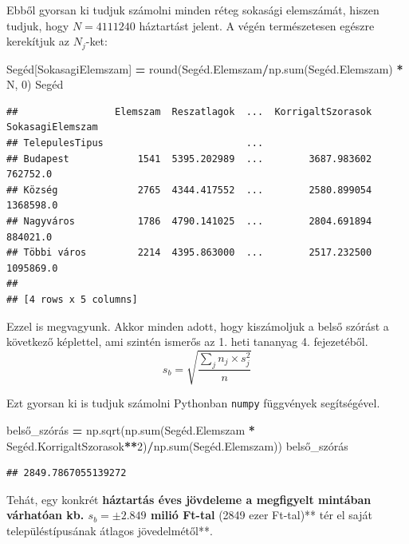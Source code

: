 \documentclass[
]{book}
\newenvironment{Shaded}{\begin{snugshade}}{\end{snugshade}}
\newcommand{\BuiltInTok}[1]{#1}
\newcommand{\DecValTok}[1]{\textcolor[rgb]{0.00,0.00,0.81}{#1}}
\newcommand{\NormalTok}[1]{#1}
\newcommand{\OperatorTok}[1]{\textcolor[rgb]{0.81,0.36,0.00}{\textbf{#1}}}
\newcommand{\StringTok}[1]{\textcolor[rgb]{0.31,0.60,0.02}{#1}}
\begin{document}
Ebből gyorsan ki tudjuk számolni minden réteg sokasági elemszámát, hiszen tudjuk, hogy \(N=4111240\) háztartást jelent. A végén természetesen egészre kerekítjuk az \(N_j\)-ket:

\begin{Shaded}
\begin{Highlighting}[]
\NormalTok{Segéd[}\StringTok{\textquotesingle{}SokasagiElemszam\textquotesingle{}}\NormalTok{] }\OperatorTok{=} \BuiltInTok{round}\NormalTok{(Segéd.Elemszam}\OperatorTok{/}\NormalTok{np.}\BuiltInTok{sum}\NormalTok{(Segéd.Elemszam) }\OperatorTok{*}\NormalTok{ N, }\DecValTok{0}\NormalTok{)}
\NormalTok{Segéd}
\end{Highlighting}
\end{Shaded}

\begin{verbatim}
##                 Elemszam  Reszatlagok  ...  KorrigaltSzorasok  SokasagiElemszam
## TelepulesTipus                         ...                                     
## Budapest            1541  5395.202989  ...        3687.983602          762752.0
## Község              2765  4344.417552  ...        2580.899054         1368598.0
## Nagyváros           1786  4790.141025  ...        2804.691894          884021.0
## Többi város         2214  4395.863000  ...        2517.232500         1095869.0
## 
## [4 rows x 5 columns]
\end{verbatim}

Ezzel is megvagyunk. Akkor minden adott, hogy kiszámoljuk a belső szórást a következő képlettel, ami szintén ismerős az 1. heti tananyag 4. fejezetéből. \[s_b=\sqrt{\frac{\sum_j{n_j \times s_j^2}}{n}}\]

Ezt gyorsan ki is tudjuk számolni Pythonban \texttt{numpy} függvények segítségével.

\begin{Shaded}
\begin{Highlighting}[]
\NormalTok{belső\_szórás }\OperatorTok{=}\NormalTok{ np.sqrt(np.}\BuiltInTok{sum}\NormalTok{(Segéd.Elemszam }\OperatorTok{*}\NormalTok{ Segéd.KorrigaltSzorasok}\OperatorTok{**}\DecValTok{2}\NormalTok{)}\OperatorTok{/}\NormalTok{np.}\BuiltInTok{sum}\NormalTok{(Segéd.Elemszam))}
\NormalTok{belső\_szórás}
\end{Highlighting}
\end{Shaded}

\begin{verbatim}
## 2849.7867055139272
\end{verbatim}

Tehát, egy konkrét \textbf{háztartás éves jövdeleme a megfigyelt mintában várhatóan kb. \(s_b=\pm 2.849\) milió Ft-tal }(2849 ezer Ft-tal)** tér el saját településtípusának átlagos jövedelmétől**.
\end{document}
